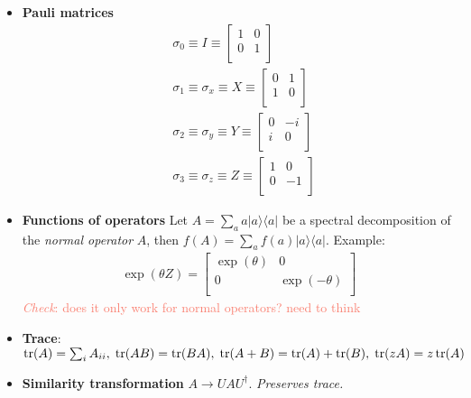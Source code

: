 \documentclass[11pt]{article}
\newcommand{\q}[1]{\textcolor{Salmon}{\emph{Check}: {#1}}}
\begin{document}
\begin{multicols}{3}
\begin{itemize}
        \item \textbf{Pauli matrices}
              \begin{align}
                   & \sigma_0 \equiv I \equiv
                  \begin{bmatrix}
                      1 & 0 \\
                      0 & 1 \\
                  \end{bmatrix} \label{sigma0}                \\
                   & \sigma_1 \equiv \sigma_x \equiv X \equiv
                  \begin{bmatrix}
                      0 & 1 \\
                      1 & 0 \\
                  \end{bmatrix} \label{sigma1}                \\
                   & \sigma_2 \equiv \sigma_y \equiv Y \equiv
                  \begin{bmatrix}
                      0 & -i \\
                      i & 0  \\
                  \end{bmatrix} \label{sigma2}                \\
                   & \sigma_3 \equiv \sigma_z \equiv Z \equiv
                  \begin{bmatrix}
                      1 & 0  \\
                      0 & -1 \\
                  \end{bmatrix}\label{sigma3}
              \end{align}
        \item \textbf{Functions of operators} Let $A=\sum_a a|a\rangle\langle a|$ be a spectral decomposition of the \textit{normal operator} $A$, then $f(A)=\sum_a f(a)|a\rangle\langle a|$. Example: \begin{align}\exp(\theta Z)=\begin{bmatrix}
                      \exp(\theta) & 0             \\
                      0            & \exp(-\theta) \\
                  \end{bmatrix}\end{align} \q{does it only work for normal operators? need to think}

        \item \textbf{Trace}: $\tr(A)=\sum_i A_{ii},\; \tr(AB)=\tr(BA),\; \tr(A+B)=\tr(A)+\tr(B),\; \tr(zA)=z\tr(A) $

        \item  \textbf{Similarity transformation} $A\rightarrow UAU^\dagger$. \textit{Preserves trace.}

    \end{itemize}




\end{multicols}
\end{document}
